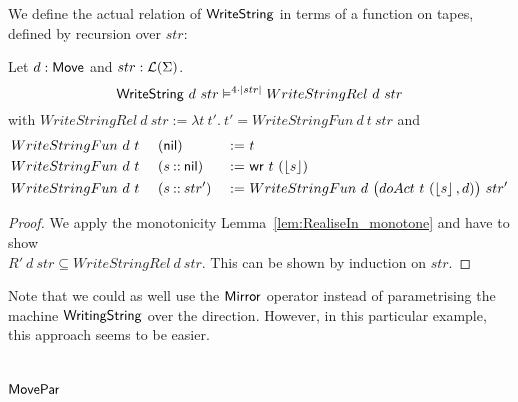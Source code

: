We define the actual relation of $\mathsf{WriteString}$ in terms of a function on tapes, defined by recursion over $str$:
\begin{lemma}
  \label{lem:WriteString_Sem}
  Let $d:\mathsf{Move}$ and $str:\mathcal{L}(\Sigma)$.
  \[ \mathsf{WriteString}~d~str \mathrel{\vDash^{4\cdot\left| str \right|}} WriteStringRel~d~str \]
  with
  $WriteStringRel~d~str := \lambda t~t'.~t' = WriteStringFun~d~t~str$ and
  \begin{alignat*}{3}
    &WriteStringFun~d~t~&&(\mathsf{nil}        ) &~:=~& t \\
    &WriteStringFun~d~t~&&(s \mathbin{::} \mathsf{nil}) &~:=~& \mathsf{wr}~t~(\left\lfloor {s} \right\rfloor) \\
    &WriteStringFun~d~t~&&(s \mathbin{::} str') &~:=~& WriteStringFun~d~\bigl(doAct~t~(\left\lfloor {s} \right\rfloor, d)\bigr)~str'
  \end{alignat*}
\end{lemma}
\begin{proof}
  We apply the monotonicity Lemma~\ref{lem:RealiseIn_monotone} and have to show\\
  $R'~d~str \subseteq WriteStringRel~d~str$.  This can be shown by induction on $str$.
\end{proof}

Note that we could as well use the $\mathsf{Mirror}$ operator instead of parametrising the machine $\mathsf{WritingString}$ over the direction.  However, in
this particular example, this approach seems to be easier.

\section{$\mathsf{MovePar}$}
\label{sec:MovePar}

